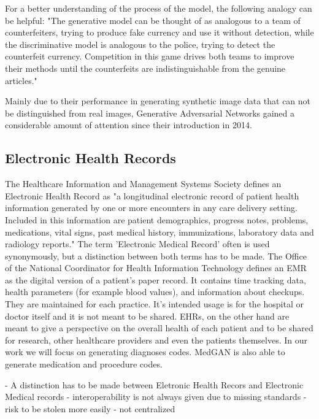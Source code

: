 \documentclass[11pt, a4paper]{book}
\begin{document}
For a better understanding of the process of the model, the following analogy can be helpful:
"The generative model can be thought of as analogous to a team of counterfeiters, trying  to  produce  fake  currency  and  use  it  without  detection,  while  the  discriminative  model  is analogous to the police, trying to detect the counterfeit currency.  Competition in this game drives both teams to improve their methods until the counterfeits are indistinguishable from the genuine articles." \cite{goodfellow2014generative}

Mainly due to their performance in generating synthetic image data that can not be distinguished from real images, Generative Adversarial Networks gained a considerable amount of attention since their introduction in 2014.


\subsection{Electronic Health Records}
The Healthcare Information and Management Systems Society defines an Electronic Health Record as "a longitudinal electronic record of patient health information generated by one or more encounters in any care delivery setting. Included in this information are patient demographics, progress notes, problems, medications, vital signs, past medical history, immunizations, laboratory data and radiology reports." \cite{HIMMS}
The term 'Electronic Medical Record' often is used synonymously, but a distinction between both terms has to be made.
The Office of the National Coordinator for Health Information Technology defines an EMR as the digital version of a patient's paper record. It contains time tracking data, health parameters (for example blood values), and information about checkups. They are maintained for each practice. It's intended usage is for the hospital or doctor itself and it is not meant to be shared. \cite{ONC}
EHRs, on the other hand are meant to give a perspective on the overall health of each patient and to be shared for research, other healthcare providers and even the patients themselves. \cite{ONC}
In our work we will focus on generating diagnoses codes. MedGAN is also able to generate medication and procedure codes.

- A distinction has to be made between Eletronic Health Recors and Electronic Medical records
- interoperability is not always given due to missing standards
- risk to be stolen more easily
- not centralized 
\end{document}
